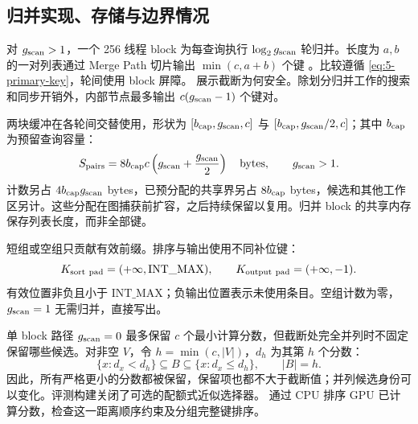 \subsection{归并实现、存储与边界情况}

对 $g_{\mathrm{scan}}>1$，一个 256 线程 block 为每查询执行 $\log_2g_{\mathrm{scan}}$ 轮归并。长度为 $a,b$ 的一对列表通过 Merge Path 切片输出 $\min(c,a+b)$ 个键 \cite{gpu_merge_path}。比较遵循 \cref{eq:5-primary-key}，轮间使用 block 屏障。 展示截断为何安全。除划分归并工作的搜索和同步开销外，内部节点最多输出 $c(g_{\mathrm{scan}}-1)$ 个键对。

两块缓冲在各轮间交替使用，形状为 $[b_{\rm cap},g_{\mathrm{scan}},c]$ 与 $[b_{\rm cap},g_{\mathrm{scan}}/2,c]$；其中 $b_{\rm cap}$ 为预留查询容量：
\begin{equation}
 S_{\rm pairs}=8b_{\rm cap}c\left(g_{\mathrm{scan}}+\frac{g_{\mathrm{scan}}}{2}\right)
 \quad\text{bytes},\qquad g_{\mathrm{scan}}>1.
 \label{eq:5-group-workspace}
\end{equation}
计数另占 $4b_{\rm cap}g_{\mathrm{scan}}$ bytes，已预分配的共享界另占 $8b_{\rm cap}$ bytes，候选和其他工作区另计。这些分配在图捕获前扩容，之后持续保留以复用。归并 block 的共享内存保存列表长度，而非全部键。

短组或空组只贡献有效前缀。排序与输出使用不同补位键：
\[
 K_{\rm sort\ pad}=(+\infty,\mathrm{INT\_MAX}),\qquad
 K_{\rm output\ pad}=(+\infty,-1).
\]
有效位置非负且小于 $\mathrm{INT\_MAX}$；负输出位置表示未使用条目。空组计数为零，$g_{\mathrm{scan}}=1$ 无需归并，直接写出。

单 block 路径 $g_{\mathrm{scan}}=0$ 最多保留 $c$ 个最小计算分数，但截断处完全并列时不固定保留哪些候选。对非空 $V$，令 $h=\min(c,|V|)$，$d_h$ 为其第 $h$ 个分数：
\[
 \{x:d_x<d_h\}\subseteq B\subseteq\{x:d_x\leq d_h\},\qquad |B|=h.
\]
因此，所有严格更小的分数都被保留，保留项也都不大于截断值；并列候选身份可以变化。评测构建关闭了可选的配额式近似选择器。 通过 CPU 排序 GPU 已计算分数，检查这一距离顺序约束及分组完整键排序。
